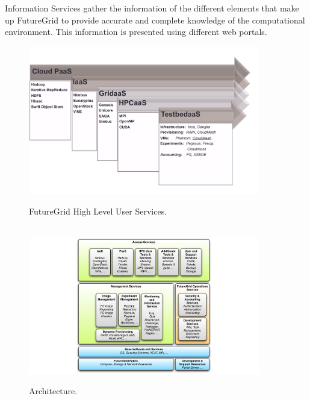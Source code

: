 Information Services gather the information of the different elements that make up FutureGrid to provide accurate and complete knowledge of the computational environment. This information is presented using different web portals.

\begin{figure}[p]
  \centering
    \includegraphics[width=0.9\textwidth]{images/user-services.pdf}
  \caption{FutureGrid High Level User Services.}
  ~\\
  \centering
  \includegraphics[width=0.9\textwidth]{images/architecture.pdf}
  \caption{Architecture.}
\end{figure}
